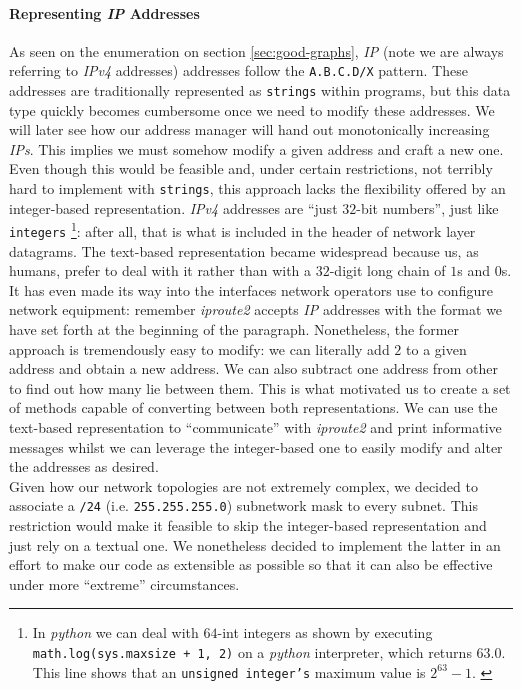     \paragraph{Representing \textit{IP} Addresses}
        As seen on the enumeration on section \ref{sec:good-graphs}, \textit{IP} (note we are always referring to \textit{IPv4} addresses) addresses follow the \texttt{A.B.C.D/X} pattern. These addresses are traditionally represented as \texttt{strings} within programs, but this data type quickly becomes cumbersome once we need to modify these addresses. We will later see how our address manager will hand out monotonically increasing \textit{IPs}. This implies we must somehow modify a given address and craft a new one. Even though this would be feasible and, under certain restrictions, not terribly hard to implement with \texttt{strings}, this approach lacks the flexibility offered by an integer-based representation. \textit{IPv4} addresses are ``just $32$-bit numbers'', just like \texttt{integers} \footnote{In \textit{python} we can deal with $64$-int integers as shown by executing \texttt{math.log(sys.maxsize + 1, 2)} on a \textit{python} interpreter, which returns $63.0$. This line shows that an \texttt{unsigned integer's} maximum value is $2^{63} - 1$. \cite{bib:python-sys}}: after all, that is what is included in the header of network layer datagrams. The text-based representation became widespread because us, as humans, prefer to deal with it rather than with a $32$-digit long chain of $1$s and $0$s. It has even made its way into the interfaces network operators use to configure network equipment: remember \textit{iproute2} accepts \textit{IP} addresses with the format we have set forth at the beginning of the paragraph. Nonetheless, the former approach is tremendously easy to modify: we can literally add $2$ to a given address and obtain a new address. We can also subtract one address from other to find out how many lie between them. This is what motivated us to create a set of methods capable of converting between both representations. We can use the text-based representation to ``communicate'' with \textit{iproute2} and print informative messages whilst we can leverage the integer-based one to easily modify and alter the addresses as desired.\\

    Given how our network topologies are not extremely complex, we decided to associate a \texttt{/24} (i.e. \texttt{255.255.255.0}) subnetwork mask to every subnet. This restriction would make it feasible to skip the integer-based representation and just rely on a textual one. We nonetheless decided to implement the latter in an effort to make our code as extensible as possible so that it can also be effective under more ``extreme'' circumstances.\\

